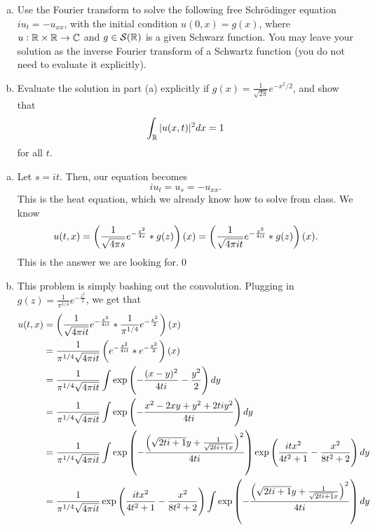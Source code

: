 \documentclass{article}
\begin{document}
\newpage
{} 
\begin{enumerate}[(a)]
    \item Use the Fourier transform to solve the following free Schr\" odinger equation $iu_t = -u_{xx}$,
    with the initial condition $u(0,x) = g(x)$, where $u : \mathbb{R}\times \mathbb{R} \to \mathbb{C}$ and $g \in \mathcal{S}(\mathbb{R})$ is a given Schwarz function.
    You may leave your solution as the inverse Fourier transform of a Schwartz function (you do not need
    to evaluate it explicitly).
    \item  Evaluate the solution in part (a) explicitly if $g(x) = \frac{1}{\sqrt{2\pi}} e^{-x^2/
    2}$, and show that 
    \[\int_{\mathbb{R}}|u(x,t)|^2dx = 1\] for
    all $t$.
\end{enumerate}
\tri
\hop 
\solution
\begin{enumerate}[(a)]
    \item Let $s = it$. Then, our equation becomes 
    \[iu_t = u_s = -u_{xx}.\]
    This is the heat equation, which we already know how to solve from class. We know 
    \begin{align*}
        u(t,x) = \del{\frac{1}{\sqrt{4\pi s}}e^{-\frac{z^2}{4s}}* g(z)}(x) =\del{\frac{1}{\sqrt{4\pi i t}}e^{-\frac{z^2}{4it}}* g(z)}(x).
    \end{align*}
    This is the answer we are looking for.\qed
    \item This problem is simply bashing out the convolution. Plugging in $g(z) = \frac{1}{\pi^{1/4}}e^{-\frac{z^2}{2}}$, we get that 
    \begin{align*}
        u(t,x) &= \del{\frac{1}{\sqrt{4\pi i t}}e^{-\frac{z^2}{4it}}* \frac{1}{\pi^{1/4}}e^{-\frac{z^2}{2}}}(x) \\
        &= \frac{1}{\pi^{1/4}\sqrt{4\pi i t}} \del{e^{-\frac{z^2}{4it}}* e^{-\frac{z^2}{2}}}(x) \\
        &=  \frac{1}{\pi^{1/4}\sqrt{4\pi i t}} \int \exp\del{ -\frac{(x-y)^2}{4ti} - \frac{y^2}{2}}dy\\
        &=  \frac{1}{\pi^{1/4}\sqrt{4\pi i t}} \int \exp\del{ -\frac{x^2-2xy+y^2+2tiy^2}{4ti}}dy\\
        &=  \frac{1}{\pi^{1/4}\sqrt{4\pi i t}} \int \exp\del{ -\frac{\del{\sqrt{2ti+1}y + \frac{1}{\sqrt{2ti+1}x}}^2}{4ti}}\exp\del{\frac{itx^2}{4t^2+1} - \frac{x^2}{8t^2+2}}dy\\
        &=  \frac{1}{\pi^{1/4}\sqrt{4\pi i t}}\exp\del{\frac{itx^2}{4t^2+1} - \frac{x^2}{8t^2+2}} \int \exp\del{ -\frac{\del{\sqrt{2ti+1}y + \frac{1}{\sqrt{2ti+1}x}}^2}{4ti}}dy\\

\end{align*}
\end{enumerate}
\end{document}
